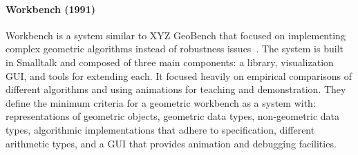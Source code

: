 
\paragraph{Workbench (1991)}

Workbench is a system similar to XYZ GeoBench that focused on implementing
complex geometric algorithms instead of robustness
issues~\cite{epstein1994workbench}. The system is built in Smalltalk and
composed of three main components: a library, visualization GUI, and tools for
extending each. It focused heavily on empirical comparisons of different
algorithms and using animations for teaching and demonstration. They define the
minimum criteria for a geometric workbench as a system with: representations of
geometric objects, geometric data types, non-geometric data types, algorithmic
implementations that adhere to specification, different arithmetic types, and a
GUI that provides animation and debugging facilities.

